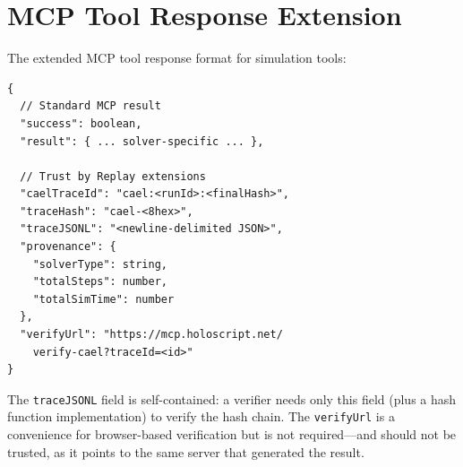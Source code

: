 \documentclass[letterpaper,twocolumn,10pt]{article}
\begin{document}
\section{MCP Tool Response Extension}
\label{app:response}

The extended MCP tool response format for simulation tools:

\begin{lstlisting}[caption={Extended MCP simulation tool response.},
  label=lst:response,language={}]
{
  // Standard MCP result
  "success": boolean,
  "result": { ... solver-specific ... },

  // Trust by Replay extensions
  "caelTraceId": "cael:<runId>:<finalHash>",
  "traceHash": "cael-<8hex>",
  "traceJSONL": "<newline-delimited JSON>",
  "provenance": {
    "solverType": string,
    "totalSteps": number,
    "totalSimTime": number
  },
  "verifyUrl": "https://mcp.holoscript.net/
    verify-cael?traceId=<id>"
}
\end{lstlisting}

The \texttt{traceJSONL} field is self-contained: a verifier needs only this
field (plus a hash function implementation) to verify the hash chain. The
\texttt{verifyUrl} is a convenience for browser-based verification but is
not required---and should not be trusted, as it points to the same server
that generated the result.
\end{document}
